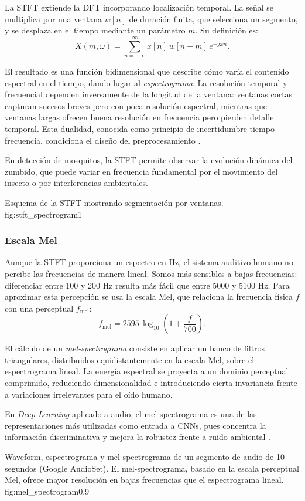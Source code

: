 La STFT extiende la DFT incorporando localización temporal.  
La señal se multiplica por una ventana $w[n]$ de duración finita, que selecciona un segmento, y se desplaza en el tiempo mediante un parámetro $m$. Su definición es:
\begin{equation}
	X(m,\omega) = \sum_{n=-\infty}^{\infty} x[n] \, w[n-m] \, e^{-j \omega n}.
	\label{eq:stft}
\end{equation}

El resultado es una función bidimensional que describe cómo varía el contenido espectral en el tiempo, dando lugar al \emph{espectrograma}.  
La resolución temporal y frecuencial dependen inversamente de la longitud de la ventana:  
ventanas cortas capturan sucesos breves pero con poca resolución espectral, mientras que ventanas largas ofrecen buena resolución en frecuencia pero pierden detalle temporal.  
Esta dualidad, conocida como principio de incertidumbre tiempo–frecuencia, condiciona el diseño del preprocesamiento \cite{Bancroft2002}.  

En detección de mosquitos, la STFT permite observar la evolución dinámica del zumbido, que puede variar en frecuencia fundamental por el movimiento del insecto o por interferencias ambientales.

{Esquema de la STFT mostrando segmentación por ventanas.}
{fig:stft_spectrogram}{1}

\subsubsection{Escala Mel}

Aunque la STFT proporciona un espectro en Hz, el sistema auditivo humano no percibe las frecuencias de manera lineal.  
Somos más sensibles a bajas frecuencias: diferenciar entre 100 y 200 Hz resulta más fácil que entre 5000 y 5100 Hz.  
Para aproximar esta percepción se usa la escala Mel, que relaciona la frecuencia física $f$ con una perceptual $f_{\text{mel}}$:
\begin{equation}
	f_{\text{mel}} = 2595 \, \log_{10}\!\left( 1 + \frac{f}{700} \right).
	\label{eq:mel}
\end{equation}

El cálculo de un \emph{mel-spectrograma} consiste en aplicar un banco de filtros triangulares, distribuidos equidistantemente en la escala Mel, sobre el espectrograma lineal.  
La energía espectral se proyecta a un dominio perceptual comprimido, reduciendo dimensionalidad e introduciendo cierta invariancia frente a variaciones irrelevantes para el oído humano.  

En \emph{Deep Learning} aplicado a audio, el mel-spectrograma es una de las representaciones más utilizadas como entrada a CNNs, pues concentra la información discriminativa y mejora la robustez frente a ruido ambiental \cite{Campos2022,HumBugDB}.

{Waveform, espectrograma y mel-spectrograma de un segmento de audio de 10 segundos (Google AudioSet). 
	El mel-spectrograma, basado en la escala perceptual Mel, ofrece mayor resolución en bajas frecuencias que el espectrograma lineal.}
{fig:mel_spectrogram}{0.9}
